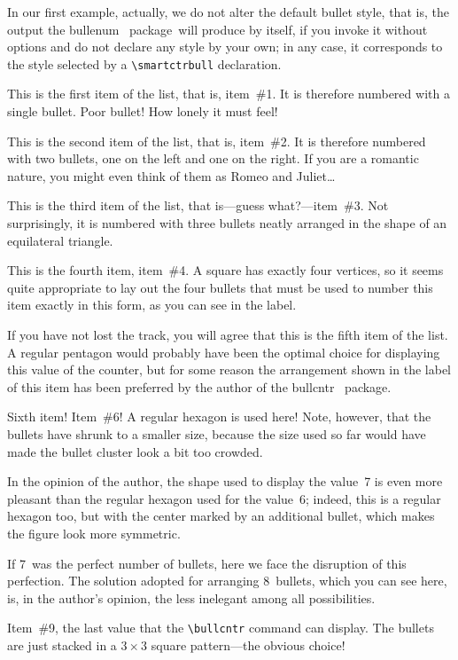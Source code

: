 \documentclass[a4paper]{article}
\DeclareRobustCommand*{\packlass}[1]{%
	{\texorpdfstring{\normalfont \sffamily}{}#1}%
}
\newcommand*{\Bullcntr}{bullcntr}
\newcommand*{\bull}{\packlass{\Bullcntr}}
\newcommand*{\tbull}{the \bull\ package}
\newcommand*{\Bullenum}{bullenum}
\newcommand*{\benu}{\packlass{\Bullenum}}
\newcommand*{\tbenu}{the \benu\ package}
\begin{document}
In our first example, actually, we do not alter the default bullet
style, that is, the output \tbenu\ will produce by itself, if you
invoke it without options and do not declare any style by your own; in
any case, it corresponds to the style selected by a
\verb|\smartctrbull| declaration.

\begin{bullenum}
	\item
		This is the first item of the list, that is, item~\#1.  It is
		therefore numbered with a single bullet.  Poor bullet!  How
		lonely it must feel!

	\item
		This is the second item of the list, that is, item~\#2.  It is
		therefore numbered with two bullets, one on the left and one
		on the right.  If you are a romantic nature, you might even
		think of them as Romeo and Juliet\ldots

	\item\label{Standard-3}
		This is the third item of the list, that is---guess
		what?---item~\#3.  Not surprisingly, it is numbered with three
		bullets neatly arranged in the shape of an equilateral
		triangle.

	\item
		This is the fourth item, item~\#4.  A square has exactly four
		vertices, so it seems quite appropriate to lay out the four
		bullets that must be used to number this item exactly in this
		form, as you can see in the label.

	\item
		If you have not lost the track, you will agree that this is
		the fifth item of the list.  A regular pentagon would probably
		have been the optimal choice for displaying this value of the
		counter, but for some reason the arrangement shown in the
		label of this item has been preferred by the author of \tbull.

	\item\label{Standard-6}
		Sixth item!  Item~\#6!  A regular hexagon is used here!  Note,
		however, that the bullets have shrunk to a smaller size,
		because the size used so far would have made the bullet
		cluster look a bit too crowded.

	\item
		In the opinion of the author, the shape used to display the
		value~7 is even more pleasant than the regular hexagon used
		for the value~6; indeed, this is a regular hexagon too, but
		with the center marked by an additional bullet, which makes
		the figure look more symmetric.

	\item
		If 7~was the perfect number of bullets, here we face the
		disruption of this perfection.  The solution adopted for
		arranging 8~bullets, which you can see here, is, in the
		author's opinion, the less inelegant among all possibilities.

	\item
		Item~\#9, the last value that the \verb|\bullcntr| command can
		display.  The bullets are just stacked in a $3\times3$ square
		pattern---the obvious choice!
\end{bullenum}
\end{document}
